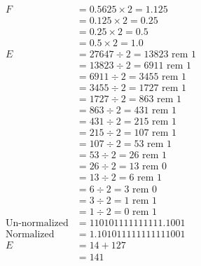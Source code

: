 \documentclass[12pt letter]{report}
\begin{document}
{\begin{enumerate}
\begin{align*}
            F                    & = 0.5625 \times 2 = 1.125             \\
                                 & = 0.125 \times 2 = 0.25               \\
                                 & = 0.25 \times 2 = 0.5                 \\
                                 & = 0.5 \times 2 = 1.0                  \\
            E                    & = 27647 \div 2 = 13823 \text{ rem } 1 \\
                                 & = 13823 \div 2 = 6911 \text{ rem } 1  \\
                                 & = 6911 \div 2 = 3455 \text{ rem } 1   \\
                                 & = 3455 \div 2 = 1727 \text{ rem } 1   \\
                                 & = 1727 \div 2 = 863 \text{ rem } 1    \\
                                 & = 863 \div 2 = 431 \text{ rem } 1     \\
                                 & = 431 \div 2 = 215 \text{ rem } 1     \\
                                 & = 215 \div 2 = 107 \text{ rem } 1     \\
                                 & = 107 \div 2 = 53 \text{ rem } 1      \\
                                 & = 53 \div 2 = 26 \text{ rem } 1       \\
                                 & = 26 \div 2 = 13 \text{ rem } 0       \\
                                 & = 13 \div 2 = 6 \text{ rem } 1        \\
                                 & = 6 \div 2 = 3 \text{ rem } 0         \\
                                 & = 3 \div 2 = 1 \text{ rem } 1         \\
                                 & = 1 \div 2 = 0 \text{ rem } 1         \\
            \text{Un-normalized} & = 110101111111111.1001                \\
            \text{Normalized}    & = 1.101011111111111001                \\
            E                    & = 14 + 127                            \\
                                 & = 141                                 \\

\end{align*}
\end{enumerate}}
\end{document}
